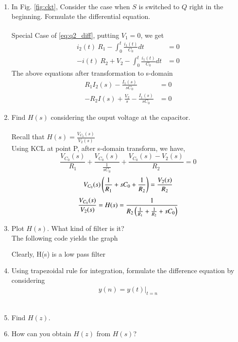 \documentclass[journal,12pt,twocolumn]{IEEEtran}
\renewcommand\thesection{\arabic{section}}
\begin{document}
\begin{enumerate}[label=\arabic*.,ref=\thesection.\theenumi]


\item In Fig. \ref{fig:ckt}, Consider the case when $S$ is switched to
	$Q$ right in the beginning. Formulate the differential equation. \\
	\solution\\
	Special Case of \eqref{eq:q2_diff}, putting $V_1 = 0$, we get
	\begin{align}
		i_2(t) \ R_1 - \int_0^t \frac{i_1(t)}{C_0} dt &= 0 \label{eq:q4_diff} \\
		-i(t) \ R_2 + V_2 - \int_0^t \frac{i_1(t)}{C_0} dt &= 0
	\end{align}
	The above equations after transformation to s-domain
	\begin{align}
		R_1 I_2(s) - \frac{I_1(s)}{sC_0} &= 0 \label{eq:q4_diff_lap} \\
		-R_2 I(s) + \frac{V_2}{s} - \frac{I_1(s)}{sC_0} &= 0 
	\end{align}


\item Find $H(s)$ considering the ouput voltage at the capacitor. \\
	\solution \\
	Recall that \( H(s) = \frac{V_{C_0}(s)}{V_2(s)} \) \\
	Using KCL at point P, after s-domain transform, we have,
	\[ \frac{V_{C_0}(s)}{R_1} + \frac{V_{C_0}(s)}{\frac{1}{sC_0}} + 
		\frac{V_{C_0}(s) - V_2(s)}{R_2} = 0 \]
	\[ V_{C_0}(s) \left(\frac{1}{R_1} + sC_0 + \frac{1}{R_2}\right) = \frac{V_2(s)}{R_2} \]
	\[ \frac{V_{C_0}(s)}{V_2(s)} = H(s) = \frac{1}{R_2\left(\frac{1}{R_1} +
		\frac{1}{R_2} + sC_0\right)} \]


\item Plot $H(s)$.  What kind of filter is it? \\
	\solution The following code yields the graph \\
	\begin{listing}

	\end{listing}
	Clearly, H(s) is a low pass filter
	

\item Using trapezoidal rule for integration, formulate the difference equation by considering
	\begin{align}
		y(n) = y(t)\vert_{t=n}
	\end{align}
	\solution \\



	\item Find $H(z)$.


	\item How can you obtain $H(z)$ from $H(s)$?
	

	\end{enumerate}
\end{document}
